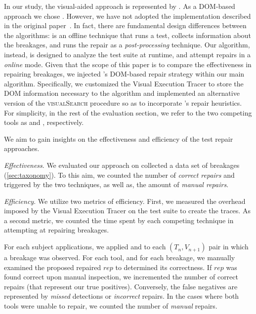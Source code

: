 In our study, the visual-aided approach is represented by \tool. As a DOM-based approach we chose \water. However, we have not adopted the implementation described in the original paper~\cite{Choudhary:2011:WWA:2002931.2002935}. In fact, there are fundamental design differences between the algorithms: \water is an offline technique that runs a test, collects information about the breakages, and runs the repair as a \textit{post-processing} technique. Our algorithm, instead, is designed to analyze the test suite at runtime, and attempt repairs in a \textit{online} mode. %
Given that the scope of this paper is to compare the effectiveness in repairing breakages, we injected \water's DOM-based repair strategy within our main algorithm. Specifically, we customized the Visual Execution Tracer to store the DOM information necessary to the algorithm and implemented an alternative version of the \textsc{visualSearch} procedure so as to incorporate \water's repair heuristics.
 For simplicity, in the rest of the evaluation section, we refer to the two competing tools as \water and \tool, respectively.

We aim to gain insights on the effectiveness and efficiency of the test repair approaches.

\noindent
\emph{Effectiveness}.
We evaluated our approach on collected a data set of breakages (\autoref{sec:taxonomy}).
To this aim, we counted the number of \textit{correct repairs} and triggered by the two techniques, as well as, the amount of \textit{manual repairs}.

\noindent
\emph{Efficiency}.
We utilize two metrics of efficiency.
First, we measured the overhead imposed by the Visual Execution Tracer on the test suite to create the traces. %
As a second metric, we counted the time spent by each competing technique in attempting at repairing breakages. 

\label{sec:procedure}
For each subject applications, we applied \water and \tool to each $(T_n,V_{n+1})$ pair in which a breakage was observed. For each tool, and for each breakage, we manually examined the proposed repaired $rep$ to determined its correctness. If $rep$ was found correct upon manual inspection, we incremented the number of correct repairs (that represent our true positives). Conversely, the false negatives are represented by \textit{missed} detections or \textit{incorrect} repairs.
In the cases where both tools were unable to repair, we counted the number of \textit{manual} repairs.

